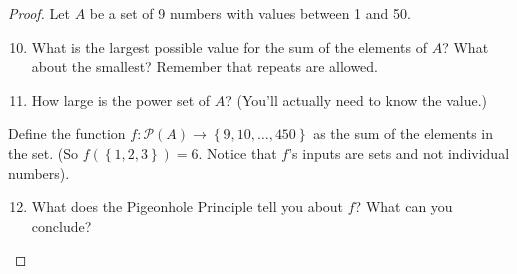 \documentclass[12 pt]{article}
\renewcommand{\P}{\mathscr{P}}
\newcommand{\set}[1]{\left\{#1\right\}}
\theoremstyle{definition}
\theoremstyle{plain}
\theoremstyle{mytheorem}
\theoremstyle{myexample}
\theoremstyle{mydefinition}
\begin{document}
\begin{mdframed}[backgroundcolor=gray!10!]
\begin{proof} Let $A$ be a set of 9 numbers with values between 1 and 50.

\begin{mdframed}[backgroundcolor=white]
\begin{enumerate} \setcounter{enumi}{9}
\item What is the largest possible value for the sum of the elements of $A$?  What about the smallest?  Remember that repeats are allowed.
\vspace{.5in}
\item How large is the power set of $A$?  (You'll actually need to know the value.)
\vspace{.5in}
\end{enumerate}
\end{mdframed}
Define the function $f: \P(A) \to \set{9,10,\ldots,450}$ as the sum of the elements in the set.  (So $f(\set{1,2,3})=6.$  Notice that $f$'s inputs are sets and not individual numbers).\\
\begin{mdframed}[backgroundcolor=white]
\begin{enumerate} \setcounter{enumi}{11}
\item What does the Pigeonhole Principle tell you about $f$?  What can you conclude?
\vspace{3in}
\end{enumerate}
\end{mdframed}
\end{proof}
\end{mdframed}
\end{document}
